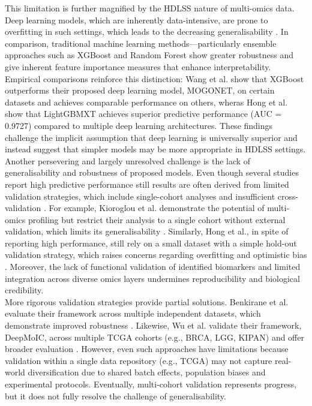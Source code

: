 \documentclass[conference]{IEEEtran}
\begin{document}
This limitation is further magnified by the HDLSS nature of multi-omics data. Deep learning models, which are inherently data-intensive, are prone to overfitting in such settings, which leads to the decreasing generalisability \cite{kang_roadmap_2022}. In comparison, traditional machine learning methods—particularly ensemble approaches such as XGBoost and Random Forest show greater robustness and give inherent feature importance measures that enhance interpretability. Empirical comparisons reinforce this distinction: Wang et al. \cite{wang_mogonet_2021} show that XGBoost outperforms their proposed deep learning model, MOGONET, on certain datasets and achieves comparable performance on others, wheras Hong et al. \cite{hong_multi-omics_2025} show that LightGBMXT achieves superior predictive performance (AUC = 0.9727) compared to multiple deep learning architectures. These findings challenge the implicit assumption that deep learning is universally superior and instead suggest that simpler models may be more appropriate in HDLSS settings.\\
Another persevering and largely unresolved challenge is the lack of generalisability and robustness of proposed models. Even though several studies report high predictive performance still results are often derived from limited validation strategies, which include single-cohort analyses and insufficient cross-validation \cite{shakyawar_icluf_nodate, kioroglou_multi-omic_2025, gillenwater_multi-omics_2021}. For example, Kioroglou et al. demonstrate the potential of multi-omics profiling but restrict their analysis to a single cohort without external validation, which limits its generalisability \cite{kioroglou_multi-omic_2025}. Similarly, Hong et al., in spite of reporting high performance, still rely on a small dataset with a simple hold-out validation strategy, which raises concerns regarding overfitting and optimistic bias \cite{hong_multi-omics_2025}. Moreover, the lack of functional validation of identified biomarkers and limited integration across diverse omics layers undermines reproducibility and biological credibility.\\
More rigorous validation strategies provide partial solutions. Benkirane et al. evaluate their framework across multiple independent datasets, which demonstrate improved robustness \cite{benkirane_customics_2023}. Likewise, Wu et al. validate their framework, DeepMoIC, across multiple TCGA cohorts (e.g., BRCA, LGG, KIPAN) and offer broader evaluation \cite{wu_deepmoic_2024}. However, even such approaches have limitations because validation within a single data repository (e.g., TCGA) may not capture real-world diversification due to shared batch effects, population biases and experimental protocols. Eventually, multi-cohort validation represents progress, but it does not fully resolve the challenge of generalisability.\\
\end{document}
